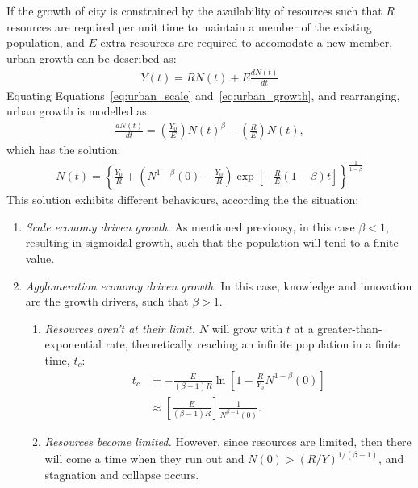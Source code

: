 If the growth of city is constrained by the availability of resources such that $R$ resources are required per unit time to maintain a member of the existing population, and $E$ extra resources are required to accomodate a new member, urban growth can be described as:
\begin{align} \label{eq:urban_growth}
	Y(t)=RN(t)+E\frac{dN(t)}{dt}
\end{align}
Equating Equations~\eqref{eq:urban_scale} and~\eqref{eq:urban_growth}, and rearranging, urban growth is modelled as:
\begin{align*}
	\frac{dN(t)}{dt}=\left(\frac{Y_0}{E}\right)N(t)^{\beta}-\left(\frac{R}{E}\right)N(t),
\end{align*}
which has the solution:
\begin{align}
	N(t)=\left\{\frac{Y_0}{R}+\left(N^{1-\beta}(0)-\frac{Y_0}{R}\right)\exp\left[-\frac{R}{E}(1-\beta)t\right]\right\}^{\frac{1}{1-\beta}}
\end{align}
This solution exhibits different behaviours, according the the situation:
\begin{enumerate}
	\item \emph{Scale economy driven growth.} As mentioned previousy, in this case $\beta<1$, resulting in sigmoidal growth, such that the population will tend to a finite value.
	\item \label{itm:agglom} \emph{Agglomeration economy driven growth.} In this case, knowledge and innovation are the growth drivers, such that $\beta>1$.
	\begin{enumerate}
		\item \emph{Resources aren't at their limit.} $N$ will grow with $t$ at a greater-than-exponential rate, theoretically reaching an infinite population in a finite time, $t_c$:
\begin{align*}
	t_c&=-\frac{E}{(\beta-1)R}\ln\left[1-\frac{R}{Y_0}N^{1-\beta}(0)\right] \\
	&\approx \left[\frac{E}{(\beta-1)R}\right]\frac{1}{N^{\beta-1}(0)}.
\end{align*}
		\item \label{itm:collapse} \emph{Resources become limited.} However, since resources are limited, then there will come a time when they run out and $N(0)>(R/Y)^{1/(\beta-1)}$, and stagnation and collapse occurs. 
	\end{enumerate}
\end{enumerate}

